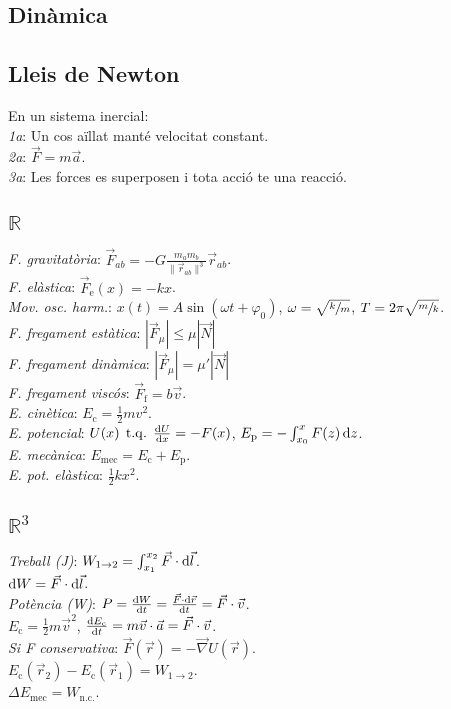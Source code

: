 \documentclass[10pt]{article}
\newcommand{\real}{\mathbb{R}}
\newcommand{\ci}{\textbullet\;}
\DeclareMathOperator{\tq}{\;t.q.\;}
\begin{document}
\begin{multicols}{4}
\section{Din\`amica}

\subsection{Lleis de Newton}
En un sistema inercial:\\
\emph{1a}: Un cos aïllat manté velocitat constant.\\
\emph{2a}: $\vec{F} = m\vec{a}$.\\
\emph{3a}: Les forces es superposen i tota acció te una reacció.

\subsection{$\real$}
\emph{F. gravitat\`oria}: $\vec{F}_{ab} = -G \frac{m_a m_b}{\|\vec{r}_{ab}\|^3} \vec{r}_{ab}$. \\
\emph{F. el\`astica}: $\vec{F}_{\text{e}}(x) = -kx$. \\
\emph{Mov. osc. harm.}: $x(t) = A\sin (\omega t + \varphi_0)$, $\omega = \sqrt{\sfrac{k}{m}}$, $T = 2\pi\sqrt{\sfrac{m}{k}}$. \\
\emph{F. fregament estàtica}: $|\vec{F}_\mu| \leq \mu |\vec{N}|$\\
\emph{F. fregament dinàmica}: $|\vec{F}_\mu| = \mu' |\vec{N}|$\\
\emph{F. fregament visc\'os}: $\vec{F}_{\text{f}} = b\vec{v}$. \\
\emph{E. cin\`etica}: $E_{\text{c}} = \frac{1}{2}mv^2$. \\
\emph{E. potencial}: $U(x) \tq \frac{\dif U}{\dif x} = -F(x)$, $E_{\text{p}} = -\int_{x_0}^x F(z) \dif z$. \\
\emph{E. mecànica}: $E_{\text{mec}} = E_{\text{c}} + E_{\text{p}}$. \\
\emph{E. pot. el\`astica}: $\frac{1}{2}kx^2$.

\subsection{$\real^3$}
\emph{Treball (J)}: $W_{1\rightarrow 2} = \int_{x_1}^{x_2} \vec{F} \cdot\dif \vec{l}$. \\
\ci $\dif W = \vec{F} \cdot\dif \vec{l}$. \\
\emph{Pot\`encia (W)}: $P = \frac{\dif W}{\dif t} = \frac{\vec{F} \cdot\dif \vec{r}}{\dif t} = \vec{F}\cdot\vec{v}$. \\
\ci $E_{\text{c}} = \frac{1}{2}m\vec{v}^2$, $\frac{\dif E_{\text{c}}}{\dif t} = m\vec{v}\cdot\vec{a} = \vec{F}\cdot\vec{v}$. \\
\emph{Si F conservativa}: $\vec{F}(\vec{r}) = -\vec{\nabla}U(\vec{r})$. \\
\ci $E_{\text{c}}(\vec{r}_2) - E_{\text{c}}(\vec{r}_1) = W_{1\rightarrow 2}$. \\
\ci $\Delta E_{\text{mec}} = W_{\text{n.c.}}$.



\end{multicols}
\end{document}
